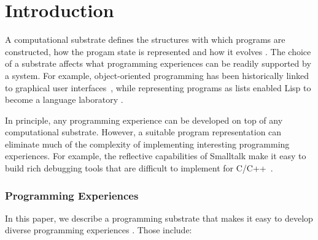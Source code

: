 \documentclass[sigconf,anonymous,screen]{acmart}
\begin{document}

\section{Introduction}

A computational substrate defines the structures with which programs are constructed, how
the progam state is represented and how it evolves \cite{jakubovic-2022-ladder}. The choice of
a substrate affects what programming experiences can be readily supported by a system. For example,
object-oriented programming has been historically linked to graphical user
interfaces~\cite{kay-1993-smalltalk}, while representing programs as lists enabled Lisp to become
a language laboratory \cite{steele-1993-lisp}.

In principle, any programming experience can be developed on top of any computational
substrate. However, a suitable program representation can eliminate much of the complexity of implementing interesting
programming experiences. For example, the reflective capabilities of Smalltalk make it easy
to build rich debugging tools \cite{rauch-2019-babylonian} that are difficult to implement
for C/C++~\cite{kell-2018-unix,kell-2024-debugging}.

\subsubsection*{Programming Experiences}

In this paper, we describe a programming substrate that makes it easy to develop diverse
programming experiences \cite{myers-2006-eup}. Those include:
\end{document}
